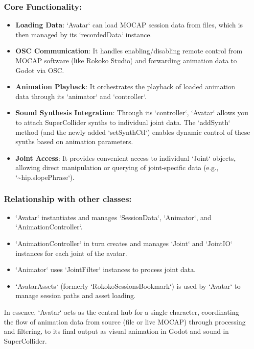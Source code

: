 \documentclass[11pt]{article}
\begin{document}
\subsubsection{\textbf{Core Functionality}:}
\label{sec:orgfb664cb}
\begin{itemize}
\item \textbf{Loading Data}: `Avatar` can load MOCAP session data from files, which is then managed by its `recordedData` instance.
\item \textbf{OSC Communication}: It handles enabling/disabling remote control from MOCAP software (like Rokoko Studio) and forwarding animation data to Godot via OSC.
\item \textbf{Animation Playback}: It orchestrates the playback of loaded animation data through its `animator` and `controller`.
\item \textbf{Sound Synthesis Integration}: Through its `controller`, `Avatar` allows you to attach SuperCollider synths to individual joint data. The `addSynth` method (and the newly added `setSynthCtl`) enables dynamic control of these synths based on animation parameters.
\item \textbf{Joint Access}: It provides convenient access to individual `Joint` objects, allowing direct manipulation or querying of joint-specific data (e.g., `\textasciitilde{}hip.slopePhrase`).
\end{itemize}
\subsubsection{\textbf{Relationship with other classes}:}
\label{sec:org53f80dd}
\begin{itemize}
\item `Avatar` instantiates and manages `SessionData`, `Animator`, and `AnimationController`.
\item `AnimationController` in turn creates and manages `Joint` and `JointIO` instances for each joint of the avatar.
\item `Animator` uses `JointFilter` instances to process joint data.
\item `AvatarAssets` (formerly `RokokoSessionsBookmark`) is used by `Avatar` to manage session paths and asset loading.
\end{itemize}

In essence, `Avatar` acts as the central hub for a single character, coordinating the flow of animation data from source (file or live MOCAP) through processing and filtering, to its final output as visual animation in Godot and sound in SuperCollider.
\end{document}
